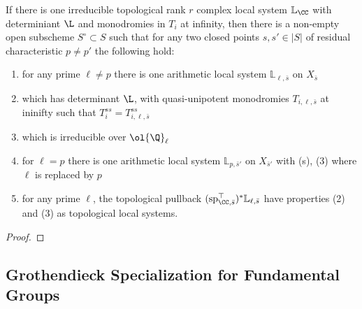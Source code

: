 \documentclass[12pt]{article}
\newcommand{\LL}{\mathbb{L}}
\theoremstyle{plain}
\begin{document}
\begin{theorem}
If there is one irreducible topological rank $r$ complex local system $\LL_{\CC}$ with determiniant $\L$ and monodromies in $T_i$ at infinity, then there is a non-empty open subscheme $S^\circ \subset S$ such that for any two closed points $s,s' \in |S|$ of residual characteristic $p \neq p'$ the following hold:
\begin{enumerate}
\item for any prime $\ell \neq p$ there is one arithmetic local system $\LL_{\ell, \bar{s}}$ on $X_{\bar{s}}$
\item which has determinant $\L$, with quasi-unipotent monodromies $T_{i,\ell, \bar{s}}$ at ininifty such that $T_i^{ss} = T_{i,\ell, \bar{s}}^{ss}$
\item which is irreducible over $\ol{\Q}_\ell$
\item for $\ell = p$ there is one arithmetic local system $\LL_{p,\bar{s}'}$ on $X_{\bar{s}'}$  with (s), (3) where $\ell$ is replaced by $p$
\item for any prime $\ell$, the topological pullback $(\mathrm{sp}_{\CC,\bar{s}}^{\top})^* \LL_{\ell, \bar{s}}$ have properties (2) and (3) as topological local systems. 
\end{enumerate}
\end{theorem}

\begin{proof}

\end{proof}

\renewcommand{\sp}{\mathrm{sp}}

\subsection{Grothendieck Specialization for Fundamental Groups}
\end{document}
